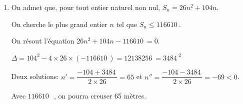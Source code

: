 \documentclass[10pt]{article}
\providecommand{\euro}{\texteuro}
\providecommand{\np}[2][]{{#2~#1}}
\providecommand{\euro}{{\text{€}}}
\renewcommand{\euro}{\ifmmode\text{\texteuro}\else\texteuro\fi}
\begin{document}
\begin{enumerate}
\item On admet que, pour tout entier naturel non nul, $S_n=26n^2 +104n$. 

On cherche le plus grand entier $n$ tel que $S_n \leqslant \np{116610}$.

On résout l'équation $26n^2 + 104n - \np{116610}=0$.

$\Delta = 104^2 - 4 \times 26 \times (-\np{116610}) = \np{12138256} = \np{3484}^2$ 

Deux solutions: $n'=\dfrac{-104+\np{3484}}{2\times 26}=65$ et $n''=\dfrac{-104-\np{3484}}{2\times 26}=-69<0$.

Avec $\np{116610}$~\euro{}, on pourra creuser 65 mètres.

\end{enumerate}

\vspace{0.5cm}
\end{document}
